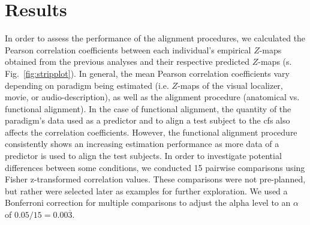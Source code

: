 \section{Results}

%
In order to assess the performance of the alignment procedures, we calculated
the Pearson correlation coefficients between each individual's empirical
$Z$-maps obtained from the previous analyses \citep{haeusler2022processing,
sengupta2016extension} and their respective predicted $Z$-maps (s.
Fig.~\ref{fig:stripplot}).
%
In general, the mean Pearson correlation coefficients vary depending on paradigm
being estimated (i.e. $Z$-maps of the visual localizer, movie, or
audio-description), as well as the alignment procedure (anatomical vs.
functional alignment).
%
In the case of functional alignment, the quantity of the paradigm's data used as
a predictor and to align a test subject to the \ac{cfs} also affects the
correlation coefficients.
%
However, the functional alignment procedure consistently shows an increasing
estimation performance as more data of a predictor is used to align the test
subjects.
%
In order to investigate potential differences between some conditions, we
conducted 15 pairwise comparisons using Fisher z-transformed correlation values.
%
These comparisons were not pre-planned, but rather were selected later as
examples for further exploration.
%
We used a Bonferroni correction for multiple comparisons to adjust the alpha
level to an $\alpha$ of $0.05 / 15 = 0.00\overline{3}$.


